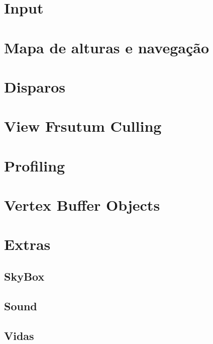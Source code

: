 \documentclass[12pt,a4paper,portuges]{style/myreport}
\begin{document}
\newpage

\chapter{Input}


\newpage	

\chapter{Mapa de alturas e navegação}

\chapter{Disparos}

\newpage

\chapter{View Frsutum Culling}


\newpage

\chapter{Profiling}


\newpage

\chapter{Vertex Buffer Objects}

\chapter{Extras}

\section{SkyBox}


\section{Sound}


\section{Vidas}

\end{document}
